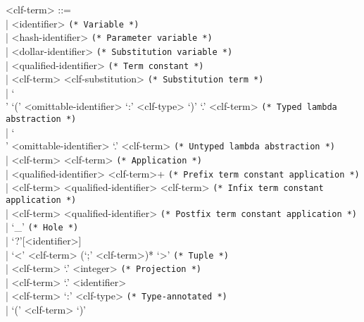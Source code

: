\documentclass[11pt]{article}
\begin{document}
\begin{grammar}
<clf-term> ::= \hfill\\
| <identifier> \hfill \texttt{(* Variable *)}\\
| <hash-identifier> \hfill \texttt{(* Parameter variable *)}\\
| <dollar-identifier> \hfill \texttt{(* Substitution variable *)}\\
| <qualified-identifier> \hfill \texttt{(* Term constant *)}\\
| <clf-term> <clf-substitution> \hfill \texttt{(* Substitution term *)}\\
| `\\' `(' <omittable-identifier> `:' <clf-type> `)' `.' <clf-term> \hfill \texttt{(* Typed lambda abstraction *)}\\
| `\\' <omittable-identifier> `.' <clf-term> \hfill \texttt{(* Untyped lambda abstraction *)}\\
| <clf-term> <clf-term> \hfill \texttt{(* Application *)}\\
| <qualified-identifier> <clf-term>+ \hfill \texttt{(* Prefix term constant application *)}\\
| <clf-term> <qualified-identifier> <clf-term> \hfill \texttt{(* Infix term constant application *)}\\
| <clf-term> <qualified-identifier> \hfill \texttt{(* Postfix term constant application *)}\\
| `_' \hfill \texttt{(* Hole *)}\\
| `?'[<identifier>]\\
| `<' <clf-term> (`;' <clf-term>)* `>' \hfill \texttt{(* Tuple *)}\\
| <clf-term> `.' <integer> \hfill \texttt{(* Projection *)}\\
| <clf-term> `.' <identifier>\\
| <clf-term> `:' <clf-type> \hfill \texttt{(* Type-annotated *)}\\
| `(' <clf-term> `)'


\end{grammar}
\end{document}
